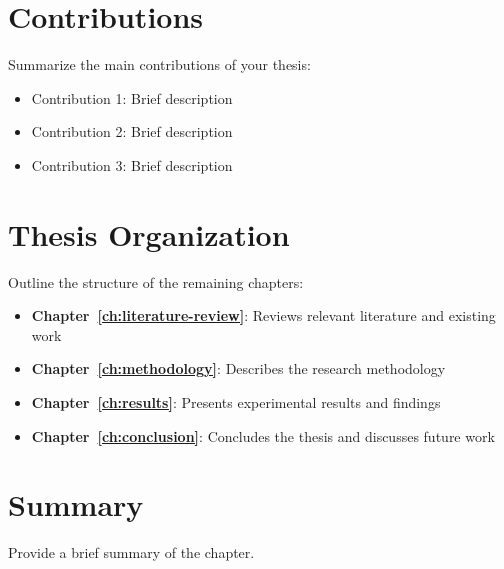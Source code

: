 \section{Contributions}
\label{sec:contributions}

Summarize the main contributions of your thesis:

\begin{itemize}
    \item Contribution 1: Brief description
    \item Contribution 2: Brief description
    \item Contribution 3: Brief description
\end{itemize}

\section{Thesis Organization}
\label{sec:organization}

Outline the structure of the remaining chapters:

\begin{itemize}
    \item \textbf{Chapter~\ref{ch:literature-review}}: Reviews relevant literature and existing work
    \item \textbf{Chapter~\ref{ch:methodology}}: Describes the research methodology
    \item \textbf{Chapter~\ref{ch:results}}: Presents experimental results and findings
    \item \textbf{Chapter~\ref{ch:conclusion}}: Concludes the thesis and discusses future work
\end{itemize}

\section{Summary}
\label{sec:intro-summary}

Provide a brief summary of the chapter.
